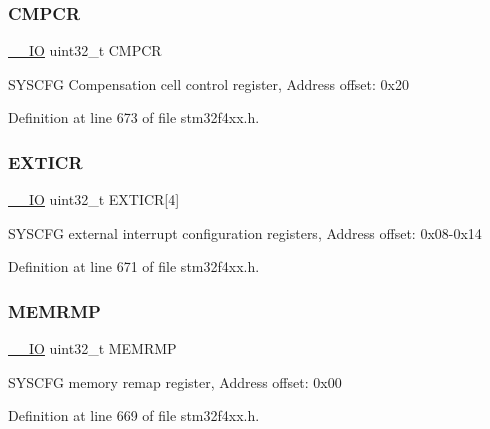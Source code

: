 \subsubsection{\texorpdfstring{C\+M\+P\+CR}{CMPCR}}
{\footnotesize\ttfamily \hyperlink{group___c_m_s_i_s__core__definitions_gaec43007d9998a0a0e01faede4133d6be}{\+\_\+\+\_\+\+IO} uint32\+\_\+t C\+M\+P\+CR}

S\+Y\+S\+C\+FG Compensation cell control register, Address offset\+: 0x20 

Definition at line 673 of file stm32f4xx.\+h.

\mbox{\label{struct_s_y_s_c_f_g___type_def_a52f7bf8003ba69d66a4e86dea6eeab65}} 
\subsubsection{\texorpdfstring{E\+X\+T\+I\+CR}{EXTICR}}
{\footnotesize\ttfamily \hyperlink{group___c_m_s_i_s__core__definitions_gaec43007d9998a0a0e01faede4133d6be}{\+\_\+\+\_\+\+IO} uint32\+\_\+t E\+X\+T\+I\+CR\mbox{[}4\mbox{]}}

S\+Y\+S\+C\+FG external interrupt configuration registers, Address offset\+: 0x08-\/0x14 

Definition at line 671 of file stm32f4xx.\+h.

\mbox{\label{struct_s_y_s_c_f_g___type_def_ab36c409d0a009e3ce5a89ac55d3ff194}} 
\subsubsection{\texorpdfstring{M\+E\+M\+R\+MP}{MEMRMP}}
{\footnotesize\ttfamily \hyperlink{group___c_m_s_i_s__core__definitions_gaec43007d9998a0a0e01faede4133d6be}{\+\_\+\+\_\+\+IO} uint32\+\_\+t M\+E\+M\+R\+MP}

S\+Y\+S\+C\+FG memory remap register, Address offset\+: 0x00 

Definition at line 669 of file stm32f4xx.\+h.

